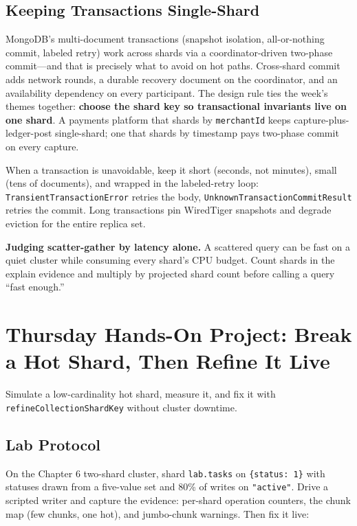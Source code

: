 \subsection{Keeping Transactions Single-Shard}
MongoDB's multi-document transactions (snapshot isolation, all-or-nothing commit, labeled retry) work across shards via a coordinator-driven two-phase commit---and that is precisely what to avoid on hot paths. Cross-shard commit adds network rounds, a durable recovery document on the coordinator, and an availability dependency on every participant. The design rule ties the week's themes together: \textbf{choose the shard key so transactional invariants live on one shard}. A payments platform that shards by \texttt{merchantId} keeps capture-plus-ledger-post single-shard; one that shards by timestamp pays two-phase commit on every capture.

\begin{notebox}
When a transaction is unavoidable, keep it short (seconds, not minutes), small (tens of documents), and wrapped in the labeled-retry loop: \texttt{TransientTransactionError} retries the body, \texttt{UnknownTransactionCommitResult} retries the commit. Long transactions pin WiredTiger snapshots and degrade eviction for the entire replica set.
\end{notebox}

\begin{pitfall}
\textbf{Judging scatter-gather by latency alone.} A scattered query can be fast on a quiet cluster while consuming every shard's CPU budget. Count shards in the explain evidence and multiply by projected shard count before calling a query ``fast enough.''
\end{pitfall}

\section{Thursday Hands-On Project: Break a Hot Shard, Then Refine It Live}
Simulate a low-cardinality hot shard, measure it, and fix it with \texttt{refineCollectionShardKey} without cluster downtime.

\subsection{Lab Protocol}
On the Chapter 6 two-shard cluster, shard \texttt{lab.tasks} on \texttt{\{status: 1\}} with statuses drawn from a five-value set and 80\% of writes on \texttt{"active"}. Drive a scripted writer and capture the evidence: per-shard operation counters, the chunk map (few chunks, one hot), and jumbo-chunk warnings. Then fix it live:

